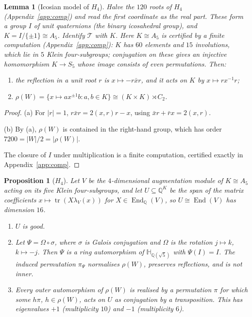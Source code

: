\documentclass[11pt]{article}
\newtheorem{lemma}[theorem]{Lemma}
\newtheorem{proposition}[theorem]{Proposition}
\theoremstyle{definition}
\newcommand{\Q}{\mathbb{Q}}
\newcommand{\HH}{\mathbb{H}}
\newcommand{\T}{\mathcal{T}}
\newcommand{\End}{\operatorname{End}}
\begin{document}
\begin{lemma}[Icosian model of $H_4$]\label{lem:icosian}
Halve the $120$ roots of $H_4$ (Appendix~\ref{app:comp}) and read the first coordinate as the real part. These
form a group $I$ of unit quaternions (the binary icosahedral group), and $K=I/\{\pm1\}\cong A_5$. Identify $\T$ with
$K$. Here $K\cong A_5$ is certified by a finite computation (Appendix~\ref{app:comp}): $K$ has $60$ elements and $15$
involutions, which lie in $5$ Klein four-subgroups; conjugation on these gives an injective homomorphism
$K\to S_5$ whose image consists of even permutations. Then:
\begin{enumerate}[label=(\alph*)]
\item the reflection in a unit root $r$ is $x\mapsto-r\bar xr$, and it acts on $K$ by $x\mapsto rx^{-1}r$;
\item $\rho(W)=\{x\mapsto ax^{\pm1}b:a,b\in K\}\cong(K\times K)\rtimes C_2$.
\end{enumerate}
\end{lemma}

\begin{proof}
(a) For $|r|=1$, $r\bar xr=2(x,r)r-x$, using $\bar xr+\bar rx=2(x,r)$.

(b) By (a), $\rho(W)$ is contained in the right-hand group, which has order $7200=|W|/2=|\rho(W)|$.

The closure of $I$ under multiplication is a finite computation, certified exactly in Appendix~\ref{app:comp}.
\end{proof}

\begin{proposition}[$H_4$]\label{prop:H4}
Let $V$ be the $4$-dimensional augmentation module of $K\cong A_5$ acting on its five Klein four-subgroups, and
let $U\subseteq\Q^K$ be the span of the matrix coefficients $x\mapsto\operatorname{tr}(X\lambda_V(x))$
for $X\in\End_{\Q}(V)$, so
$U\cong\End(V)$ has dimension $16$.
\begin{enumerate}[label=(\alph*)]
\item $U$ is good.
\item Let $\Psi=\Omega\circ\sigma$, where $\sigma$ is Galois conjugation and $\Omega$ is the rotation $j\mapsto k$,
$k\mapsto-j$. Then $\Psi$ is a ring automorphism of $\HH_{\Q(\sqrt5)}$ with $\Psi(I)=I$. The induced permutation
$\pi_\Psi$ normalises $\rho(W)$, preserves reflections, and is not inner.
\item Every outer automorphism of $\rho(W)$ is realised by a permutation $\pi$ for which some
$h\pi$, $h\in\rho(W)$, acts on $U$ as conjugation by a transposition. This has
eigenvalues $+1$ (multiplicity $10$) and $-1$ (multiplicity $6$).
\end{enumerate}
\end{proposition}
\end{document}
